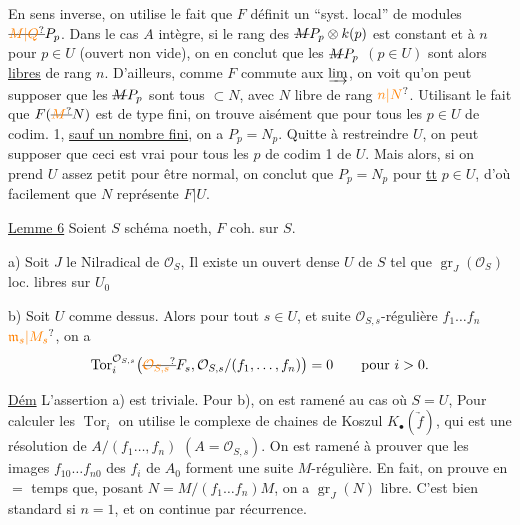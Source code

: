 En sens inverse, on utilise le fait que $F$ définit un ``syst. local'' de modules $\deleted{\unsure{M|Q}}P_p$. Dans le cas $A$ intègre,  si le rang des $\deleted{M}P_p\otimes k(p)$ est constant et  à $n$ pour $p\in U$ (ouvert non vide),  on en conclut que les $\deleted{M}P_p$ $(p\in U)$ sont alors \uline{libres} de rang $n$. D'ailleurs,  comme $F$ commute aux $\varinjlim$, on voit qu'on peut supposer que les $\deleted{M}P_p$ sont tous $\subset N$, avec $N$ libre de rang $\unsure{n|N}$. Utilisant le fait que  $F(\deleted{\unsure{M}}N)$ est de type fini, on trouve aisément que pour tous les $p\in U$ de codim. 1, \uline{sauf un nombre fini}, on a $P_p=N_p$. Quitte à restreindre $U$, on peut supposer que ceci est vrai pour tous les $p$ de codim 1 de $U$. Mais alors, si on prend $U$ assez petit pour être normal, on conclut que $P_p=N_p$ pour \uline{tt} $p\in U$,  d'où facilement que $N$ représente $F|U$.

\uline{Lemme 6} \quad Soient $S$ schéma   noeth, $F$  coh. sur $S$.

a) Soit $J$ le Nilradical de $\mathcal O_S$,  Il existe un ouvert dense $U$ de $S$ tel que  $\operatorname{gr}_J(\mathcal O_S)$  loc. libres sur $U_0$

b) Soit $U$ comme dessus. Alors pour tout $s\in U$, et  suite $\mathcal O_{S,s}$-régulière $f_1\ldots f_n$  $\unsure{\mathfrak m_s|M_s}$,  on a
\[
\operatorname{Tor}^{\mathcal O_{S,s}}_i\bigl(\deleted{\unsure{\mathcal O_{S,s}}}F_s,\mathcal O_{S,s}/(f_1,\ldots,f_n)\bigr)=0\qquad\text{pour }i>0.
\]

\uline{Dém} L'assertion a) est triviale. Pour b), on est ramené au cas où $S=U$,   Pour calculer les $\operatorname{Tor}_i$ on utilise le complexe de chaines de Koszul $K_{\bullet}(\underrightarrow f)$, qui est une résolution de $A/(f_1\ldots,f_n)$ $(A=\mathcal O_{S,s})$. On est ramené à prouver que les images $f_{10}\ldots f_{n0}$ des $f_i$ de $A_0$ forment   une suite $M$-régulière. En fait, on prouve en $=$ temps que, posant $N=M/(f_1\ldots f_n)M$, on a $\operatorname{gr}_J(N)$  libre. C'est bien standard si $n=1$, et on continue par récurrence.

